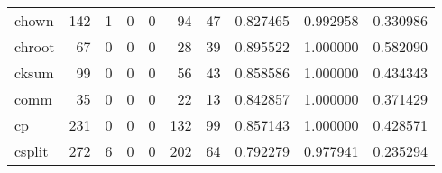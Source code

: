 \begin{tabular}{lrrrrrrrrr}
chown     &                                       142 &                                                  1 &                                                  0 &                                                  0 &                                                 94 &                                                 47 &                                           0.827465 &                               0.992958 &                             0.330986 \\
chroot    &                                        67 &                                                  0 &                                                  0 &                                                  0 &                                                 28 &                                                 39 &                                           0.895522 &                               1.000000 &                             0.582090 \\
cksum     &                                        99 &                                                  0 &                                                  0 &                                                  0 &                                                 56 &                                                 43 &                                           0.858586 &                               1.000000 &                             0.434343 \\
comm      &                                        35 &                                                  0 &                                                  0 &                                                  0 &                                                 22 &                                                 13 &                                           0.842857 &                               1.000000 &                             0.371429 \\
cp        &                                       231 &                                                  0 &                                                  0 &                                                  0 &                                                132 &                                                 99 &                                           0.857143 &                               1.000000 &                             0.428571 \\
csplit    &                                       272 &                                                  6 &                                                  0 &                                                  0 &                                                202 &                                                 64 &                                           0.792279 &                               0.977941 &                             0.235294 \\

\end{tabular}
